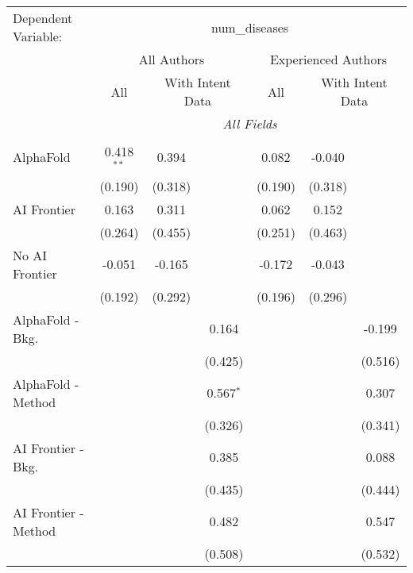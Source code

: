 \begingroup
\centering
\begin{tabular}{lcccccc}
   \tabularnewline \midrule \midrule
   Dependent Variable: & \multicolumn{6}{c}{num\_diseases}\\
 & \multicolumn{3}{c}{All Authors} & \multicolumn{3}{c}{Experienced Authors} \\
\cmidrule(lr){2-4} \cmidrule(lr){5-7}
 & \multicolumn{1}{c}{All} & \multicolumn{2}{c}{With Intent Data} & \multicolumn{1}{c}{All} & \multicolumn{2}{c}{With Intent Data} \\
\cmidrule(lr){2-2} \cmidrule(lr){3-4} \cmidrule(lr){5-5} \cmidrule(lr){6-7}
 & \multicolumn{6}{c}{\textit{All Fields}} \\ \\
   AlphaFold               & 0.418$^{**}$ & 0.394   &              & 0.082   & -0.040  &   \\   
                           & (0.190)      & (0.318) &              & (0.190) & (0.318) &   \\   
   AI Frontier             & 0.163        & 0.311   &              & 0.062   & 0.152   &   \\   
                           & (0.264)      & (0.455) &              & (0.251) & (0.463) &   \\   
   No AI Frontier          & -0.051       & -0.165  &              & -0.172  & -0.043  &   \\   
                           & (0.192)      & (0.292) &              & (0.196) & (0.296) &   \\   
   AlphaFold - Bkg.        &              &         & 0.164        &         &         & -0.199\\   
                           &              &         & (0.425)      &         &         & (0.516)\\   
   AlphaFold - Method      &              &         & 0.567$^{*}$  &         &         & 0.307\\   
                           &              &         & (0.326)      &         &         & (0.341)\\   
   AI Frontier - Bkg.      &              &         & 0.385        &         &         & 0.088\\   
                           &              &         & (0.435)      &         &         & (0.444)\\   
   AI Frontier - Method    &              &         & 0.482        &         &         & 0.547\\   
                           &              &         & (0.508)      &         &         & (0.532)\\   

\end{tabular}
